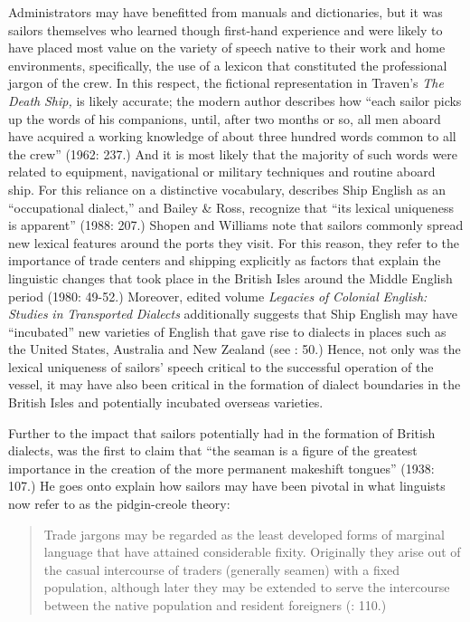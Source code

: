 Administrators may have benefitted from manuals and dictionaries, but it was sailors themselves who learned though first-hand experience and were likely to have placed most value on the variety of speech native to their work and home environments, specifically, the use of a lexicon that constituted the professional jargon of the crew. In this respect, the fictional representation in Traven’s \textit{The} \textit{Death} \textit{Ship,} is likely accurate; the modern author describes how “each sailor picks up the words of his companions, until, after two months or so, all men aboard have acquired a working knowledge of about three hundred words common to all the crew” (1962: 237.) And it is most likely that the majority of such words were related to equipment, navigational or military techniques and routine aboard ship. For this reliance on a distinctive vocabulary, \citet{Hancock1986} describes Ship English as an “occupational dialect,” and Bailey \& Ross, recognize that “its lexical uniqueness is apparent” (1988: 207.) Shopen and Williams note that sailors commonly spread new lexical features around the ports they visit. For this reason, they refer to the importance of trade centers and shipping explicitly as factors that explain the linguistic changes that took place in the British Isles around the Middle English period (1980: 49-52.) Moreover,  edited volume \textit{Legacies} \textit{of} \textit{Colonial} \textit{English:} \textit{Studies} \textit{in} \textit{Transported} \textit{Dialects} additionally suggests that Ship English may have “incubated” new varieties of English that gave rise to dialects in places such as the United States, Australia and New Zealand (see \citealt{Hickey2004}: 50.) Hence, not only was the lexical uniqueness of sailors’ speech critical to the successful operation of the vessel, it may have also been critical in the formation of dialect boundaries in the British Isles and potentially incubated overseas varieties.

Further to the impact that sailors potentially had in the formation of British dialects, \citet{Reinecke1938} was the first to claim that “the seaman is a figure of the greatest importance in the creation of the more permanent makeshift tongues” (1938: 107.) He goes onto explain how sailors may have been pivotal in what linguists now refer to as the pidgin-creole theory:

\begin{quotation}
Trade jargons may be regarded as the least developed forms of marginal language that have attained considerable fixity. Originally they arise out of the casual intercourse of traders (generally seamen) with a fixed population, although later they may be extended to serve the intercourse between the native population and resident foreigners (\citealt{Reinecke1938}: 110.) \end{quotation}

